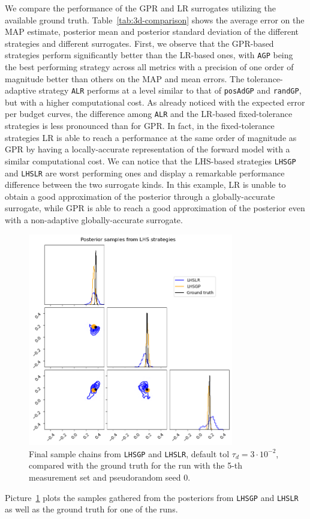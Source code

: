 We compare the performance of the GPR and LR surrogates utilizing the available ground truth.
Table~\ref{tab:3d-comparison} shows the average error on the MAP estimate, posterior mean and posterior standard deviation of the different strategies and different surrogates.
First, we observe that the GPR-based strategies perform significantly better than the LR-based ones, with \texttt{AGP} being the best performing strategy across all metrics with a precision of one order of magnitude better than others on the MAP and mean errors. 
The tolerance-adaptive strategy \texttt{ALR} performs at a level similar to that of \texttt{posAdGP} and \texttt{randGP}, but with a higher computational cost.
As already noticed with the expected error per budget curves, the difference among \texttt{ALR} and the LR-based fixed-tolerance strategies is less pronounced than for GPR.
In fact, in the fixed-tolerance strategies LR is able to reach a performance at the same order of magnitude as GPR by having a locally-accurate representation of the forward model with a similar computational cost.
We can notice that the LHS-based strategies \texttt{LHSGP} and \texttt{LHSLR} are worst performing ones and display a remarkable performance difference between the two surrogate kinds. 
In this example, LR is unable to obtain a good approximation of the posterior through a globally-accurate surrogate, while GPR is able to reach a good approximation of the posterior even with a non-adaptive globally-accurate surrogate.
\begin{figure}[t]
\begin{center}
    \includegraphics[width=0.8\textwidth]{results/pictures/d3/LHS_samples4_0.png}
\end{center}
\caption{Final sample chains from \texttt{LHSGP} and \texttt{LHSLR}, default tol $\tau_d = 3\cdot 10^{-2}$, compared with the ground truth for the run with the 5-th measurement set and pseudorandom seed 0.}
    \label{fig:3d-LHS}
\end{figure}
Picture~\ref{fig:3d-LHS} plots the samples gathered from the posteriors from \texttt{LHSGP} and \texttt{LHSLR} as well as the ground truth for one of the runs.




